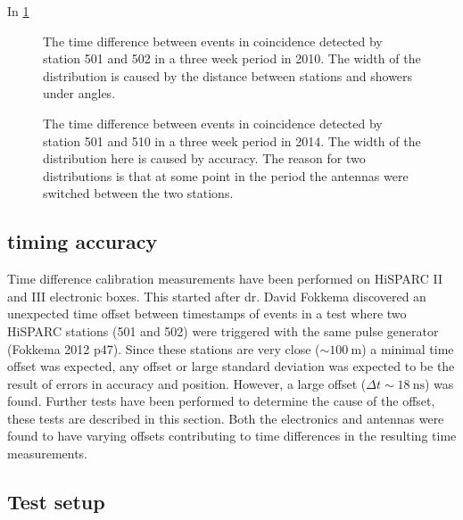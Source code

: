 In \cref{fig:station_offsets_501_502}
\begin{figure}
    \centering
    
    \caption{ The
             time difference between events in coincidence detected by
             station 501 and 502 in a three week period in 2010. The
             width of the distribution is caused by the distance between
             stations and showers under angles.}
    \label{fig:station_offsets_501_502}
\end{figure}

\begin{figure}
    \centering
    
    \caption{ The
             time difference between events in coincidence detected by
             station 501 and 510 in a three week period in 2014. The
             width of the distribution here is caused by \gps accuracy.
             The reason for two distributions is that at some point in
             the period the \gps antennas were switched between the two
             stations.}
    \label{fig:station_offsets_501_510}
\end{figure}


\subsection{\gps timing accuracy}
\label{sec:gps_accuracy}

Time difference calibration measurements have been performed on HiSPARC II and III electronic boxes. This started after dr. David Fokkema discovered an unexpected time offset between timestamps of events in a test where two HiSPARC stations (501 and 502) were triggered with the same pulse generator (Fokkema 2012 p47). Since these stations are very close ($\sim\SI{100}{\meter}$) a minimal time offset was expected, any offset or large standard deviation was expected to be the result of errors in \gps accuracy and position. However, a large offset ($\Delta t \sim\SI{18}{\ns}$) was found. Further tests have been performed to determine the cause of the offset, these tests are described in this section. Both the \hisparc electronics and \gps antennas were found to have varying offsets contributing to time differences in the resulting time measurements.



\subsection{Test setup}
\label{sub:gps_test_setup}

